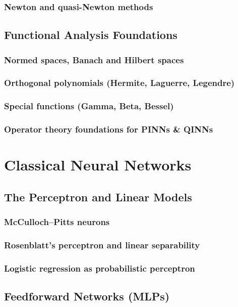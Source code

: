 \section{Newton and quasi-Newton methods}

\chapter{Functional Analysis Foundations}
\section{Normed spaces, Banach and Hilbert spaces}
\section{Orthogonal polynomials (Hermite, Laguerre, Legendre)}
\section{Special functions (Gamma, Beta, Bessel)}
\section{Operator theory foundations for PINNs \& QINNs}

\part{Classical Neural Networks}

\chapter{The Perceptron and Linear Models}
\section{McCulloch–Pitts neurons}
\section{Rosenblatt’s perceptron and linear separability}
\section{Logistic regression as probabilistic perceptron}

\chapter{Feedforward Networks (MLPs)}
